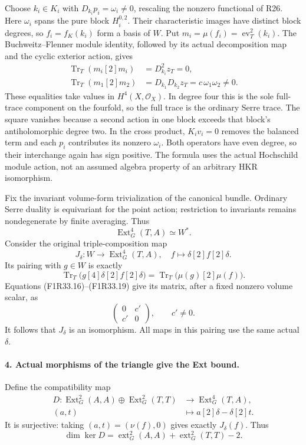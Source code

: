 Choose $k_i\in K_i$ with
$D_{k_i}p_i=\omega_i\ne0$, rescaling
the nonzero functional of R26.
Here $\omega_i$ spans the pure block
$H^{0,2}_i$. Their characteristic
images have distinct block degrees,
so $f_i=f_K(k_i)$ form a basis of $W$.
Put $m_i=\mu(f_i)=\operatorname{ev}_T^2(k_i)$.
The Buchweitz--Flenner module identity,
followed by its actual decomposition
map and the cyclic exterior action,
gives
\[
 \begin{split}
 \operatorname{Tr}_T(m_i[2]m_i)
                         &=D_{k_i}^2z_T=0,\\
 \operatorname{Tr}_T(m_1[2]m_2)
                         &=D_{k_1}D_{k_2}z_T
                           =c\,\omega_1\omega_2\ne0.
 \end{split}
 \tag{F1R33.16}
\]
These equalities take values in
$H^4(X,\mathcal O_X)$. In degree four
this is the sole full-trace component
on the fourfold, so the full trace is
the ordinary Serre trace. The square
vanishes because a second action in
one block exceeds that block's
antiholomorphic degree two. In the
cross product, $K_i v_i=0$ removes
the balanced term and each $p_i$
contributes its nonzero $\omega_i$.
Both operators have even degree,
so their interchange again has sign
positive. The formula uses the actual
Hochschild module action, not an
assumed algebra property of an
arbitrary HKR isomorphism.

Fix the invariant volume-form
trivialization of the canonical
bundle. Ordinary Serre duality is
equivariant for the point action;
restriction to invariants remains
nondegenerate by finite averaging.
Thus
\[
           \operatorname{Ext}^4_G(T,A)\simeq W^*.
 \tag{F1R33.17}
\]
Consider the original triple-composition map
\[
 J_\delta:W\longrightarrow\operatorname{Ext}^4_G(T,A),
             \quad f\longmapsto\delta[2]f[2]\delta.
 \tag{F1R33.18}
\]
Its pairing with $g\in W$ is exactly
\[
 \operatorname{Tr}_T\bigl(g[4]\delta[2]f[2]\delta\bigr)
              =\operatorname{Tr}_T\bigl(\mu(g)[2]\mu(f)\bigr).
 \tag{F1R33.19}
\]
Equations (F1R33.16)--(F1R33.19)
give its matrix, after a fixed
nonzero volume scalar, as
\[
                         \begin{pmatrix}0&c'\\c'&0\end{pmatrix},
                                  \qquad c'\ne0.
 \tag{F1R33.20}
\]
It follows that $J_\delta$ is an
isomorphism. All maps in this pairing
use the same actual $\delta$.

\paragraph{4. Actual morphisms of the triangle give the Ext bound.}
Define the compatibility map
\[
 \begin{split}
 D:\operatorname{Ext}^2_G(A,A)\oplus
                 \operatorname{Ext}^2_G(T,T)
        &\longrightarrow\operatorname{Ext}^4_G(T,A),\\
 (a,t)&\longmapsto a[2]\delta-\delta[2]t.
 \end{split}
 \tag{F1R33.21}
\]
It is surjective: taking $(a,t)=(\nu(f),0)$
gives exactly $J_\delta(f)$. Thus
\[
 \dim\ker D=\operatorname{ext}^2_G(A,A)
                    +\operatorname{ext}^2_G(T,T)-2.
 \tag{F1R33.22}
\]

